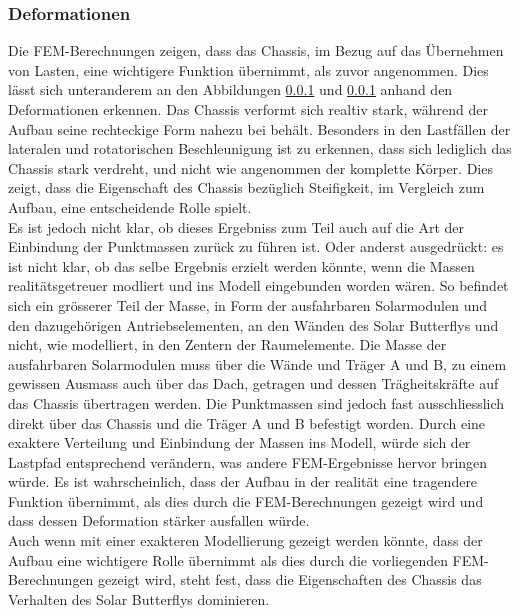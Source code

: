 \subsubsection{Deformationen}
Die FEM-Berechnungen zeigen, dass das Chassis, im Bezug auf das Übernehmen von Lasten, eine wichtigere Funktion übernimmt, als zuvor angenommen. Dies lässt sich unteranderem an den Abbildungen \ref{} und \ref{} anhand den Deformationen erkennen. Das Chassis verformt sich realtiv stark, während der Aufbau seine rechteckige Form nahezu bei behält. Besonders in den Lastfällen der lateralen und rotatorischen Beschleunigung ist zu erkennen, dass sich lediglich das Chassis stark verdreht, und nicht wie angenommen der komplette Körper. Dies zeigt, dass die Eigenschaft des Chassis bezüglich Steifigkeit, im Vergleich zum Aufbau, eine entscheidende Rolle spielt. \\

Es ist jedoch nicht klar, ob dieses Ergebniss zum Teil auch auf die Art der Einbindung der Punktmassen zurück zu führen ist. Oder anderst ausgedrückt: es ist nicht klar, ob das selbe Ergebnis erzielt werden könnte, wenn die Massen realitätsgetreuer modliert und ins Modell eingebunden worden wären. So befindet sich ein grösserer Teil der Masse, in Form der ausfahrbaren Solarmodulen und den dazugehörigen Antriebselementen, an den Wänden des Solar Butterflys und nicht, wie modelliert, in den Zentern der Raumelemente.
Die Masse der ausfahrbaren Solarmodulen muss über die Wände und Träger A und B, zu einem gewissen Ausmass auch über das Dach, getragen und dessen Trägheitskräfte auf das Chassis übertragen werden. Die Punktmassen sind jedoch fast ausschliesslich direkt über das Chassis und die Träger A und B befestigt worden. Durch eine exaktere Verteilung und Einbindung der Massen ins Modell, würde sich der Lastpfad entsprechend verändern, was andere FEM-Ergebnisse hervor bringen würde.
Es ist wahrscheinlich, dass der Aufbau in der realität eine tragendere Funktion übernimmt, als dies durch die FEM-Berechnungen gezeigt wird und dass dessen Deformation stärker ausfallen würde.\\
Auch wenn mit einer exakteren Modellierung gezeigt werden könnte, dass der Aufbau eine wichtigere Rolle übernimmt als dies durch die vorliegenden FEM-Berechnungen gezeigt wird, steht fest, dass die Eigenschaften des Chassis das Verhalten des Solar Butterflys dominieren.\\

